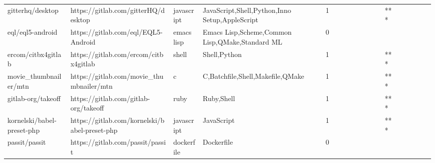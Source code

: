 \begin{tabular}{llllrlllllllllllll}
gitterhq/desktop                                   &                https://gitlab.com/gitterHQ/desktop &        javascript &     JavaScript,Shell,Python,Inno Setup,AppleScript &       1 &         &        &           &                &                 &        &           &       *** &          &          &       &              &          \\
eql/eql5-android                                   &                https://gitlab.com/eql/EQL5-Android &        emacs lisp &    Emacs Lisp,Scheme,Common Lisp,QMake,Standard ML &       0 &         &        &           &                &                 &        &           &           &          &          &       &              &          \\
ercom/citbx4gitlab                                 &              https://gitlab.com/ercom/citbx4gitlab &             shell &                                       Shell,Python &       1 &         &        &           &                &                 &        &           &       *** &          &          &       &              &          \\
movie\_thumbnailer/mtn                              &           https://gitlab.com/movie\_thumbnailer/mtn &                 c &                   C,Batchfile,Shell,Makefile,QMake &       1 &         &        &           &                &                 &        &           &       *** &          &          &       &              &          \\
gitlab-org/takeoff                                 &              https://gitlab.com/gitlab-org/takeoff &              ruby &                                         Ruby,Shell &       1 &         &        &           &                &                 &        &           &       *** &          &          &       &              &          \\
kornelski/babel-preset-php                         &      https://gitlab.com/kornelski/babel-preset-php &        javascript &                                         JavaScript &       1 &         &        &           &                &                 &        &           &       *** &          &          &       &              &          \\
passit/passit                                      &                   https://gitlab.com/passit/passit &        dockerfile &                                         Dockerfile &       0 &         &        &           &                &                 &        &           &           &          &          &       &              &          \\

\end{tabular}
